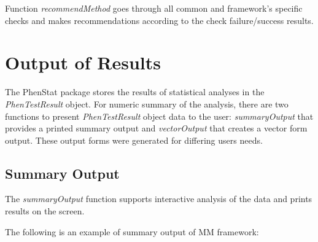 \documentclass[12pt,a4paper]{article}
\begin{document}
Function \textit{recommendMethod} goes through all common and framework's specific checks and makes recommendations according to the check failure/success results.  
\section{Output of Results}
\label{section:Results}
The PhenStat package stores the results of statistical analyses in the \textit{PhenTestResult} object.  
For numeric summary of the analysis, there are two functions to present \textit{PhenTestResult} object data to the user: 
\textit{summaryOutput} that provides a printed summary output and \textit{vectorOutput} that creates a vector form output. 
These output forms were generated for differing users needs. 

\subsection{Summary Output}
\label{SummaryOutput}
The \textit{summaryOutput} function supports interactive analysis of the data and prints results on the screen.

The following is an example of summary output of MM framework:
\end{document}
